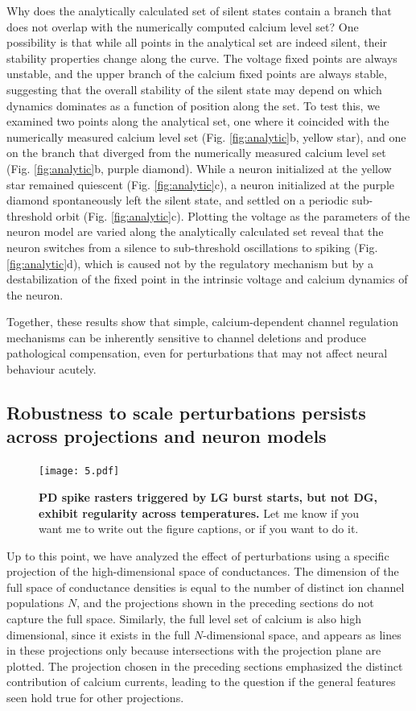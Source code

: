 \documentclass[9pt,lineno]{elife}
\begin{document}
Why does the analytically calculated set of silent states contain a branch that does not overlap with the numerically computed calcium level set? One possibility is that while all points in the analytical set are indeed silent, their stability properties change along the curve. The voltage fixed points are always unstable, and the upper branch of the calcium fixed points are always stable, suggesting that the overall stability of the silent state may depend on which dynamics dominates as a function of position along the set. To test this, we examined two points along the analytical set, one where it coincided with the numerically measured calcium level set (Fig. \ref{fig:analytic}b, yellow star), and one on the branch that diverged from the numerically measured calcium level set (Fig. \ref{fig:analytic}b, purple diamond). While a neuron initialized at the yellow star remained quiescent (Fig. \ref{fig:analytic}c), a neuron initialized at the purple diamond spontaneously left the silent state, and settled on a periodic sub-threshold orbit (Fig. \ref{fig:analytic}c). Plotting the voltage as the parameters of the neuron model are varied along the analytically calculated set reveal that the neuron switches from a silence to sub-threshold oscillations to spiking (Fig. \ref{fig:analytic}d), which is caused not by the regulatory mechanism but by a destabilization of the fixed point in the intrinsic voltage and calcium dynamics of the neuron. 

Together, these results show that simple, calcium-dependent channel regulation mechanisms can be inherently sensitive to channel deletions and produce pathological compensation, even for perturbations that may not affect neural behaviour acutely.

\subsection{Robustness to scale perturbations persists across projections and neuron models}

\begin{figure}[!hbp]
\centering
\begin{fullwidth}
\texttt{[image: 5.pdf]}
\end{fullwidth}
\caption{\textbf{PD spike rasters triggered by LG burst starts, but not DG, exhibit regularity across temperatures.} Let me know if you want me to write out the figure captions, or if you want to do it.   }
\end{figure}

Up to this point, we have analyzed the effect of perturbations using a specific projection of the high-dimensional space of conductances. The dimension of the full space of conductance densities is equal to the number of distinct ion channel populations $N$, and the projections shown in the preceding sections do not capture the full space. Similarly, the full level set of calcium is also high dimensional, since it exists in the full $N$-dimensional space, and appears as lines in these projections only because intersections with the projection plane are plotted. The projection chosen in the preceding sections emphasized the distinct contribution of calcium currents, leading to the question if the general features seen hold true for other projections.
\end{document}
